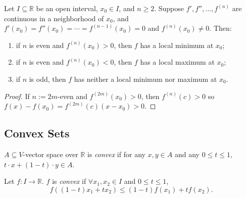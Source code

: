 \begin{theorem}\footnotemark
    Let $I \subseteq \mathbb{R}$ be an open interval, $x_0 \in I$, and $n \geq 2$. Suppose $f', f'', \dots, f^{(n)}$ are continuous in a neighborhood of $x_0$, and $f'(x_0) = f''(x_0) = \cdots = f^{(n-1)}(x_0) = 0$ and $f^{(n)}(x_0) \neq 0$. Then:
    \begin{enumerate}
        \item if $n$ is even and $f^{(n)}(x_0) > 0$, then $f$ has a local minimum at $x_0$;
        \item if $n$ is even and $f^{(n)}(x_0) < 0$, then $f$ has a local maximum at $x_0$;
        \item if $n$ is odd, then $f$ has neither a local minimum nor maximum at $x_0$.
    \end{enumerate}
\end{theorem}


\begin{proof}
    If $n := 2m$-even and $f^{(2m)}(x_0) > 0$, then $f^{(n)}(c) > 0$ so $f(x) - f(x_0) = f^{(2m)}(c)(x-x_0) > 0$.
\end{proof}

\subsection{Convex Sets}

\begin{definition}
    $A \subseteq V$-vector space over $\mathbb{R}$ is \emph{convex} if for any $x,y \in A$ and any $0 \leq t \leq 1$, $t \cdot x + (1 - t)\cdot y \in A$.
\end{definition}

\begin{definition}
    Let $f : I \to \mathbb{R}$. $f$ is \emph{convex} if $\forall x_1, x_2 \in I$ and $0 \leq t \leq 1$, $$f((1-t)x_1 + tx_2) \leq (1-t)f(x_1) + tf(x_2).$$
\end{definition}